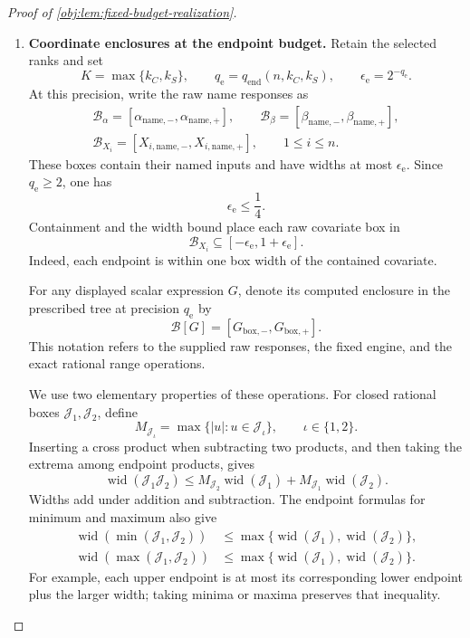 \begin{proof}[Proof of \cref{obj:lem:fixed-budget-realization}]
\begin{enumerate}
\item \textbf{Coordinate enclosures at the endpoint budget.}
Retain the selected ranks and set
\[
K=\max\{k_C,k_S\},
\qquad
q_{\mathrm e}=q_{\mathrm{end}}(n,k_C,k_S),
\qquad
\epsilon_{\mathrm e}=2^{-q_{\mathrm e}}.
\]
At this precision, write the raw name responses as
\[
\begin{gathered}
\mathcal B_\alpha
=[\alpha_{\mathrm{name},-},\alpha_{\mathrm{name},+}],
\qquad
\mathcal B_\beta
=[\beta_{\mathrm{name},-},\beta_{\mathrm{name},+}],\\
\mathcal B_{X_i}
=[X_{i,\mathrm{name},-},X_{i,\mathrm{name},+}],
\qquad 1\le i\le n.
\end{gathered}
\]
These boxes contain their named inputs and have widths at most \(\epsilon_{\mathrm e}\). Since \(q_{\mathrm e}\ge2\), one has
\[
\epsilon_{\mathrm e}\le\frac14.
\]
Containment and the width bound place each raw covariate box in
\[
\mathcal B_{X_i}\subseteq[-\epsilon_{\mathrm e},1+\epsilon_{\mathrm e}].
\]
Indeed, each endpoint is within one box width of the contained covariate.

For any displayed scalar expression \(G\), denote its computed enclosure in the prescribed tree at precision \(q_{\mathrm e}\) by
\[
\mathcal B[G]=[G_{\mathrm{box},-},G_{\mathrm{box},+}].
\]
This notation refers to the supplied raw responses, the fixed engine, and the exact rational range operations.

We use two elementary properties of these operations. For closed rational boxes \(\mathcal J_1,\mathcal J_2\), define
\[
M_{\mathcal J_\iota}
=\max\{|u|:u\in\mathcal J_\iota\},
\qquad \iota\in\{1,2\}.
\]
Inserting a cross product when subtracting two products, and then taking the extrema among endpoint products, gives
\[
\operatorname{wid}(\mathcal J_1\mathcal J_2)
\le
M_{\mathcal J_2}\operatorname{wid}(\mathcal J_1)
+
M_{\mathcal J_1}\operatorname{wid}(\mathcal J_2).
\]
Widths add under addition and subtraction. The endpoint formulas for minimum and maximum also give
\[
\begin{aligned}
\operatorname{wid}(\min(\mathcal J_1,\mathcal J_2))
&\le\max\{\operatorname{wid}(\mathcal J_1),
          \operatorname{wid}(\mathcal J_2)\},\\
\operatorname{wid}(\max(\mathcal J_1,\mathcal J_2))
&\le\max\{\operatorname{wid}(\mathcal J_1),
          \operatorname{wid}(\mathcal J_2)\}.
\end{aligned}
\]
For example, each upper endpoint is at most its corresponding lower endpoint plus the larger width; taking minima or maxima preserves that inequality.


\end{enumerate}
\end{proof}
